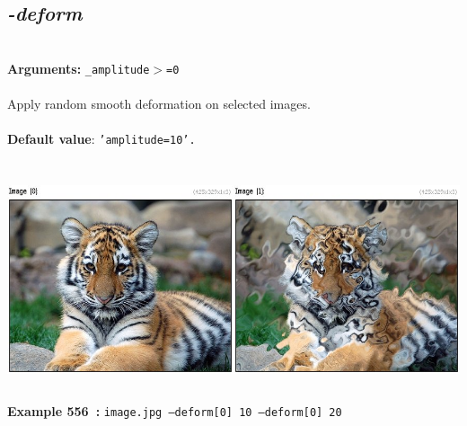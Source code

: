 \documentclass[a4paper,11pt,twoside]{book}
\begin{document}
\subsection{\emph{-deform} }\vspace*{-0.5em}
~\\\textbf{Arguments: } 
{\small \texttt{\_amplitude$>$=0}}\\~\\
Apply random smooth deformation on selected images.
~\\~\\\textbf{Default value}: {\small \texttt{'amplitude=10'.}}
\begin{center}\includegraphics[keepaspectratio=true,height=7cm,width=\textwidth]{img/gmic_def556.jpg}\\
{\footnotesize \textbf{Example 556~:} \texttt{image.jpg --deform[0] 10 --deform[0] 20}}
\end{center}
\end{document}
